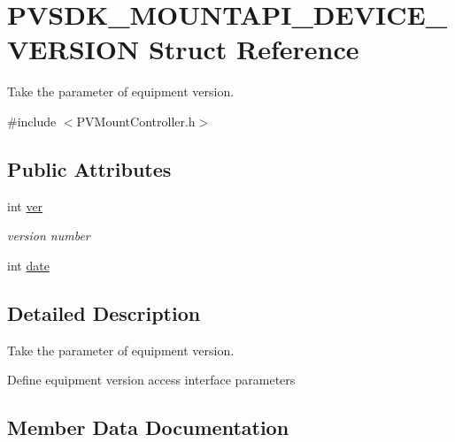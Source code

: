 \hypertarget{struct_p_v_s_d_k___m_o_u_n_t_a_p_i___d_e_v_i_c_e___v_e_r_s_i_o_n}{}\section{P\+V\+S\+D\+K\+\_\+\+M\+O\+U\+N\+T\+A\+P\+I\+\_\+\+D\+E\+V\+I\+C\+E\+\_\+\+V\+E\+R\+S\+I\+ON Struct Reference}
\label{struct_p_v_s_d_k___m_o_u_n_t_a_p_i___d_e_v_i_c_e___v_e_r_s_i_o_n}


Take the parameter of equipment version.  




{\ttfamily \#include $<$P\+V\+Mount\+Controller.\+h$>$}

\subsection*{Public Attributes}
\begin{DoxyCompactItemize}
\item 
int \hyperlink{struct_p_v_s_d_k___m_o_u_n_t_a_p_i___d_e_v_i_c_e___v_e_r_s_i_o_n_a6eb4817cddfe52e095cc1b60639aaf11}{ver}
\begin{DoxyCompactList}\small\item\em version number \end{DoxyCompactList}\item 
int \hyperlink{struct_p_v_s_d_k___m_o_u_n_t_a_p_i___d_e_v_i_c_e___v_e_r_s_i_o_n_a2bc7e6238c21add76f9df8d780a473d9}{date}
\end{DoxyCompactItemize}


\subsection{Detailed Description}
Take the parameter of equipment version. 

Define equipment version access interface parameters 

\subsection{Member Data Documentation}
\mbox{\label{struct_p_v_s_d_k___m_o_u_n_t_a_p_i___d_e_v_i_c_e___v_e_r_s_i_o_n_a2bc7e6238c21add76f9df8d780a473d9}} 
